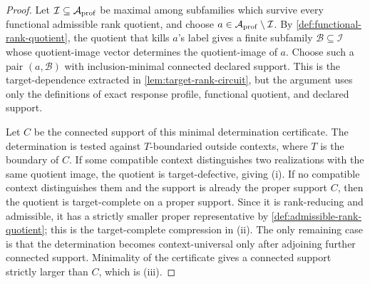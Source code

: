 \documentclass[11pt]{article}
\begin{document}
\begin{proof}
Let \(\mathcal I\subseteq\mathcal A_{\rm prof}\) be maximal among subfamilies
which survive every functional admissible rank quotient, and choose
\(a\in\mathcal A_{\rm prof}\setminus\mathcal I\).  By
\cref{def:functional-rank-quotient}, the quotient that kills \(a\)'s label
gives a finite subfamily \(\mathcal B\subseteq\mathcal I\) whose quotient-image
vector determines the quotient-image of \(a\).  Choose such a pair
\((a,\mathcal B)\) with inclusion-minimal connected declared support.  This is
the target-dependence extracted in \cref{lem:target-rank-circuit}, but the
argument uses only the definitions of exact response profile, functional
quotient, and declared support.

Let \(C\) be the connected support of this minimal determination certificate.
The determination is tested against \(T\)-boundaried outside contexts, where
\(T\) is the boundary of \(C\).  If some compatible context distinguishes two
realizations with the same quotient image, the quotient is target-defective,
giving (i).  If no compatible context distinguishes them and the support is
already the proper support \(C\), then the quotient is target-complete on a
proper support.  Since it is rank-reducing and admissible, it has a strictly
smaller proper representative by \cref{def:admissible-rank-quotient}; this is
the target-complete compression in (ii).  The only remaining case is that the
determination becomes context-universal only after adjoining further connected
support.  Minimality of the certificate gives a connected support strictly
larger than \(C\), which is (iii).
\end{proof}
\end{document}
